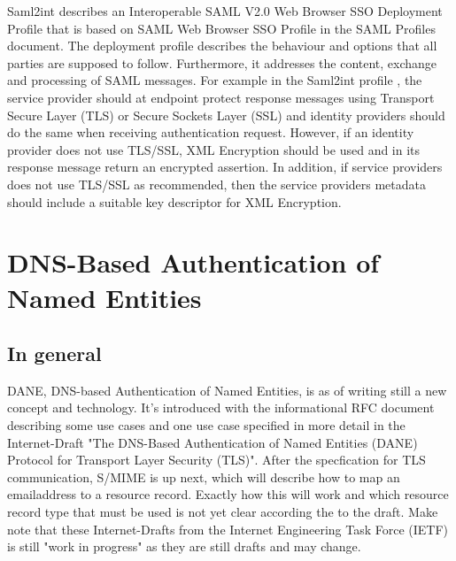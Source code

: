 Saml2int \cite{website:saml2int} describes an Interoperable SAML V2.0 Web Browser SSO Deployment Profile that is based on 
SAML Web Browser SSO Profile in the SAML Profiles document\cite{pdf:oasis-open-profiles}. 
The deployment profile describes the behaviour and options that all parties are supposed to follow. 
Furthermore, it addresses the content, exchange and processing of SAML messages.
For example in the Saml2int profile \cite{website:saml2int}, the service provider should at endpoint protect response 
messages using Transport Secure Layer (TLS) or Secure Sockets Layer (SSL)  and identity providers should do the same when receiving 
authentication request. 
However, if an identity provider does not use TLS/SSL, XML Encryption should be used and in its response message return an encrypted assertion. 
In addition, if service providers does not use TLS/SSL as recommended, then the service providers metadata should include a suitable key descriptor for XML Encryption.


\section{DNS-Based Authentication of Named Entities} 
\subsection{In general}
DANE, DNS-based Authentication of Named Entities, is as of writing still a new concept and technology.
It's introduced with the informational RFC document\cite{rfc:6394} describing some use cases and one use case specified in more detail in the Internet-Draft "The DNS-Based Authentication of Named Entities (DANE) Protocol for Transport Layer Security (TLS)"\cite{rfc:draft-dane}.
After the specfication for TLS communication, S/MIME is up next, which will describe how to map an emailaddress to a resource record.
Exactly how this will work and which resource record type that must be used is not yet clear according the to the draft\cite{rfc:draft-smime}.
Make note that these Internet-Drafts from the Internet Engineering Task Force (IETF) is still "work in progress" as they are still drafts and may change.

